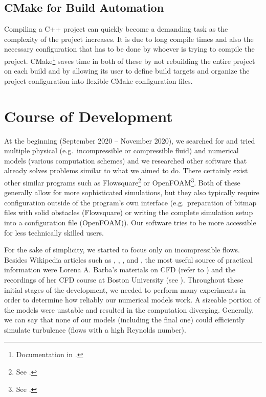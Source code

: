 \documentclass[11pt,a4paper,twoside,openright]{report}
\begin{document}
\subsection{CMake for Build Automation}
Compiling a C++ project can quickly become a demanding task as the complexity of the project increases. It is due to long compile times and also the necessary configuration that has to be done by whoever is trying to compile the project. CMake\footnote{Documentation in \cite{cmakedoc}.} saves time in both of these by not rebuilding the entire project on each build and by allowing its user to define build targets and organize the project configuration into flexible CMake configuration files.

\section{Course of Development}
At the beginning (September 2020 -- November 2020), we searched for and tried multiple physical (e.g.\ incompressible or compressible fluid) and numerical models (various computation schemes) and we researched other software that already solves problems similar to what we aimed to do. There certainly exist other similar programs such as Flowsquare\footnote{See \cite{Flowsquare}.} or OpenFOAM\footnote{See \cite{OpenFOAM}.}. Both of these generally allow for more sophisticated simulations, but they also typically require configuration outside of the program's own interface (e.g.\ preparation of bitmap files with solid obstacles (Flowsquare) or writing the complete simulation setup into a configuration file (OpenFOAM)). Our software tries to be more accessible for less technically skilled users.

For the sake of simplicity, we started to focus only on incompressible flows. Besides Wikipedia articles such as \cite{WikiNavierStokes}, \cite{WikiJacobi}, \cite{WikiGaussSeidel}, and \cite{WikiSOR}, the most useful source of practical information were Lorena A. Barba's materials on CFD (refer to \cite{CFDpython}) and the recordings of her CFD course at Boston University (see \cite{BarbaCourse}). Throughout these initial stages of the development, we needed to perform many experiments in order to determine how reliably our numerical models work. A sizeable portion of the models were unstable and resulted in the computation diverging. Generally, we can say that none of our models (including the final one) could efficiently simulate turbulence (flows with a high Reynolds number).
\end{document}
